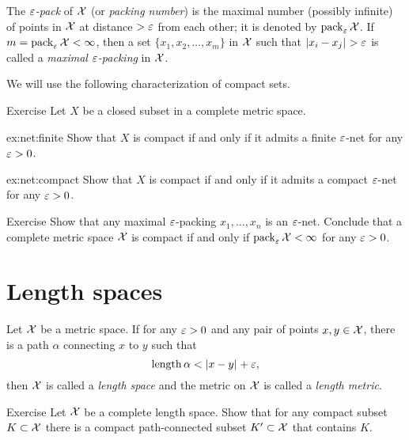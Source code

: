 The \emph{$\varepsilon$-pack} of $\mathcal{X}$ (or \emph{packing number}) is the maximal number  (possibly infinite) of points in $\mathcal{X}$ at distance $>\varepsilon$ from each other;  it is denoted by $\operatorname{\rm pack}\nolimits_\varepsilon\mathcal{X}$.
If $m=\operatorname{\rm pack}\nolimits_\varepsilon\mathcal{X}<\infty$, then a set $\{x_1,x_2,\dots,x_m\}$ in $\mathcal{X}$
such that $|{x_i}-{x_j}|_{}^{{}}>\varepsilon$ is called a \emph{maximal $\varepsilon$-packing} in $\mathcal{X}$.

We will use the following characterization of compact sets.

\begin{thm}{Exercise}\label{ex:net}
Let $X$ be a closed subset in a complete metric space.

\begin{subthm}{ex:net:finite}
Show that $X$ is compact if and only if it admits a finite $\varepsilon$-net for any $\varepsilon>0$.
\end{subthm}

\begin{subthm}{ex:net:compact}
Show that $X$ is compact if and only if it admits a compact $\varepsilon$-net for any $\varepsilon>0$.
\end{subthm}

\end{thm}

\begin{thm}{Exercise}\label{ex:pack-net}
Show that any maximal $\varepsilon$-packing $x_1,\dots,x_n$ is an $\varepsilon$-net.
Conclude that a complete metric space $\mathcal{X}$ is compact if and only if $\operatorname{\rm pack}\nolimits_\varepsilon\mathcal{X}<\infty$ for any $\varepsilon>0$.
\end{thm}

\section{Length spaces}\label{sec:length}

Let $\mathcal{X}$ be a metric space.
If for any $\varepsilon>0$ and any pair of points $x,y\in\mathcal{X}$, there is a path $\alpha$ connecting $x$ to $y$ such that
\[\mathop{\rm length}\nolimits\alpha< |{x}-{y}|_{}^{{}}+\varepsilon,\]
then $\mathcal{X}$ is called a \emph{length space} and the metric on $\mathcal{X}$ is called a \emph{length metric}.\label{page:length metric}

\begin{thm}{Exercise}\label{ex:compact+connceted}
Let $\mathcal{X}$ be a complete length space.
Show that for any compact subset $K\subset\mathcal{X}$
there is a compact path-connected subset $K'\subset\mathcal{X}$ that contains $K$.  
\end{thm}

